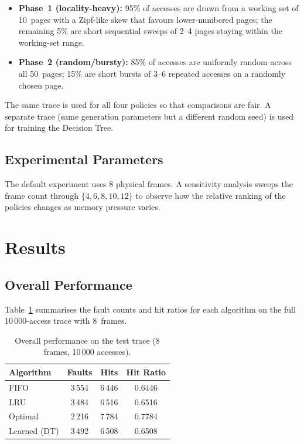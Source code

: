 \documentclass[11pt, a4paper]{article}
\begin{document}
\begin{itemize}
    \item \textbf{Phase~1 (locality-heavy):} 95\% of accesses are drawn from a working set of 10~pages with a Zipf-like skew that favours lower-numbered pages; the remaining 5\% are short sequential sweeps of 2--4 pages staying within the working-set range.
    \item \textbf{Phase~2 (random/bursty):} 85\% of accesses are uniformly random across all 50~pages; 15\% are short bursts of 3--6 repeated accesses on a randomly chosen page.
\end{itemize}

The same trace is used for all four policies so that comparisons are fair.
A separate trace (same generation parameters but a different random seed) is used for training the Decision Tree.

\subsection{Experimental Parameters}

The default experiment uses 8 physical frames.
A sensitivity analysis sweeps the frame count through $\{4, 6, 8, 10, 12\}$ to observe how the relative ranking of the policies changes as memory pressure varies.


\section{Results}
\label{sec:results}

\subsection{Overall Performance}

Table~\ref{tab:overall} summarises the fault counts and hit ratios for each algorithm on the full 10\,000-access trace with 8~frames.

\begin{table}[H]
\centering
\caption{Overall performance on the test trace (8 frames, 10\,000 accesses).}
\label{tab:overall}
\begin{tabular}{@{}lccc@{}}
\toprule
\textbf{Algorithm} & \textbf{Faults} & \textbf{Hits} & \textbf{Hit Ratio} \\
\midrule
FIFO           & 3\,554  & 6\,446  & 0.6446  \\
LRU            & 3\,484  & 6\,516  & 0.6516  \\
Optimal        & 2\,216  & 7\,784  & 0.7784  \\
Learned (DT)   & 3\,492  & 6\,508  & 0.6508  \\
\bottomrule
\end{tabular}
\end{table}
\end{document}
